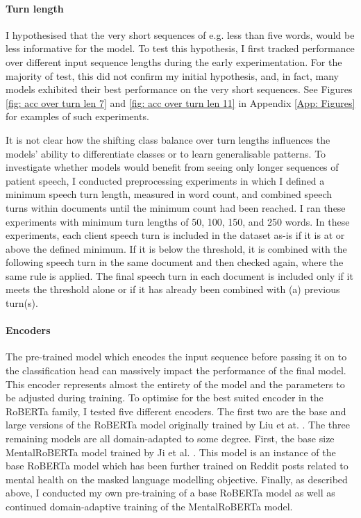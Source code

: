 \documentclass[12pt]{report}
\begin{document}
\paragraph*{Turn length}
I hypothesised that the very short sequences of e.g. less than five words, would be less informative for the model.
To test this hypothesis, I first tracked performance over different input sequence lengths during the early experimentation.
For the majority of test, this did not confirm my initial hypothesis, and, in fact, many models exhibited their best performance on the very short sequences.
See Figures \ref{fig: acc over turn len 7} and \ref{fig: acc over turn len 11} in Appendix \ref{App: Figures} for examples of such experiments.

It is not clear how the shifting class balance over turn lengths influences the models' ability to differentiate classes or to learn generalisable patterns.
To investigate whether models would benefit from seeing only longer sequences of patient speech, I conducted preprocessing experiments in which I defined a minimum speech turn length, measured in word count, and combined speech turns within documents until the minimum count had been reached.
I ran these experiments with minimum turn lengths of 50, 100, 150, and 250 words.
In these experiments, each client speech turn is included in the dataset as-is if it is at or above the defined minimum.
If it is below the threshold, it is combined with the following speech turn in the same document and then checked again, where the same rule is applied.
The final speech turn in each document is included only if it meets the threshold alone or if it has already been combined with (a) previous turn(s).

\paragraph*{Encoders}
The pre-trained model which encodes the input sequence before passing it on to the classification head can massively impact the performance of the final model.
This encoder represents almost the entirety of the model and the parameters to be adjusted during training.
To optimise for the best suited encoder in the RoBERTa family, I tested five different encoders.
The first two are the base and large versions of the RoBERTa model originally trained by Liu et at. \citeyear{roberta}.
The three remaining models are all domain-adapted to some degree.
First, the base size MentalRoBERTa model trained by Ji et al. \citeyear{MentalBERT}.
This model is an instance of the base RoBERTa model which has been further trained on Reddit posts related to mental health on the masked language modelling objective.
Finally, as described above, I conducted my own pre-training of a base RoBERTa model as well as continued domain-adaptive training of the MentalRoBERTa model.
\end{document}
